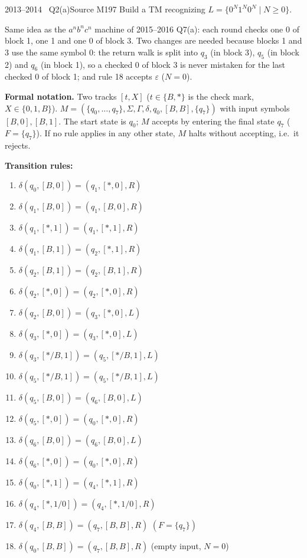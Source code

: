 \documentclass[11pt,a4paper]{article}
\newcommand{\eps}{\varepsilon}
\begin{document}
\begin{question}{2013--2014 \textbullet\ Q2(a)}{Source M19}{7}
Build a TM recognizing $L=\{0^N1^N0^N\mid N\ge0\}$.
\end{question}
\begin{solution}
Same idea as the $a^nb^nc^n$ machine of 2015--2016 Q7(a): each round checks one 0 of block 1, one 1 and one 0 of block 3. Two changes are needed because blocks 1 and 3 use the same symbol 0: the return walk is split into $q_3$ (in block 3), $q_5$ (in block 2) and $q_6$ (in block 1), so a checked 0 of block 3 is never mistaken for the last checked 0 of block 1; and rule 18 accepts $\eps$ ($N=0$).

\textbf{Formal notation.} Two tracks $[t,X]$ ($t\in\{B,\ast\}$ is the check mark, $X\in\{0,1,B\}$). $M=(\{q_0,\dots,q_7\},\Sigma,\Gamma,\delta,q_0,[B,B],\{q_7\})$ with input symbols $[B,0],[B,1]$. The start state is $q_0$; $M$ accepts by entering the final state $q_7$ ($F=\{q_7\}$). If no rule applies in any other state, $M$ halts without accepting, i.e.\ it rejects.
\par\noindent\textbf{Transition rules:}
{\small\begin{enumerate}[label=\arabic*.,itemsep=0pt]
\item $\delta(q_0,[B,0])=(q_1,[\ast,0],R)$
\item $\delta(q_1,[B,0])=(q_1,[B,0],R)$
\item $\delta(q_1,[\ast,1])=(q_1,[\ast,1],R)$
\item $\delta(q_1,[B,1])=(q_2,[\ast,1],R)$
\item $\delta(q_2,[B,1])=(q_2,[B,1],R)$
\item $\delta(q_2,[\ast,0])=(q_2,[\ast,0],R)$
\item $\delta(q_2,[B,0])=(q_3,[\ast,0],L)$
\item $\delta(q_3,[\ast,0])=(q_3,[\ast,0],L)$
\item $\delta(q_3,[\ast/B,1])=(q_5,[\ast/B,1],L)$
\item $\delta(q_5,[\ast/B,1])=(q_5,[\ast/B,1],L)$
\item $\delta(q_5,[B,0])=(q_6,[B,0],L)$
\item $\delta(q_5,[\ast,0])=(q_0,[\ast,0],R)$
\item $\delta(q_6,[B,0])=(q_6,[B,0],L)$
\item $\delta(q_6,[\ast,0])=(q_0,[\ast,0],R)$
\item $\delta(q_0,[\ast,1])=(q_4,[\ast,1],R)$
\item $\delta(q_4,[\ast,1/0])=(q_4,[\ast,1/0],R)$
\item $\delta(q_4,[B,B])=(q_7,[B,B],R)$ \quad $(F=\{q_7\})$
\item $\delta(q_0,[B,B])=(q_7,[B,B],R)$ \quad (empty input, $N=0$)
\end{enumerate}}
\end{solution}
\end{document}
